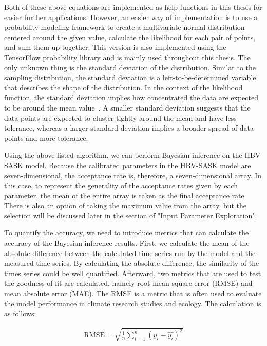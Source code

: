 Both of these above equations are implemented as help functions in this thesis for easier further applications. However, an easier way of implementation is to use a probability modeling framework to create a multivariate normal distribution centered around the given value, calculate the likelihood for each pair of points, and sum them up together. This version is also implemented using the TensorFlow probability library and is mainly used throughout this thesis. The only unknown thing is the standard deviation of the distribution. Similar to the sampling distribution, the standard deviation is a left-to-be-determined variable that describes the shape of the distribution. In the context of the likelihood function, the standard deviation implies how concentrated the data are expected to be around the mean value~\cite{standard_deviation_estimation}. A smaller standard deviation suggests that the data points are expected to cluster tightly around the mean and have less tolerance, whereas a larger standard deviation implies a broader spread of data points and more tolerance. 

Using the above-listed algorithm, we can perform Bayesian inference on the HBV-SASK model. Because the calibrated parameters in the HBV-SASK model are seven-dimensional, the acceptance rate is, therefore, a seven-dimensional array. In this case, to represent the generality of the acceptance rates given by each parameter, the mean of the entire array is taken as the final acceptance rate. There is also an option of taking the maximum value from the array, but the selection will be discussed later in the section of "Input Parameter Exploration".

To quantify the accuracy, we need to introduce metrics that can calculate the accuracy of the Bayesian inference results. First, we calculate the mean of the absolute difference between the calculated time series run by the model and the measured time series. By calculating the absolute difference, the similarity of the times series could be well quantified. Afterward, two metrics that are used to test the goodness of fit are calculated, namely root mean square error (RMSE) and mean absolute error (MAE). The RMSE is a metric that is often used to evaluate the model performance in climate research studies and ecology. The calculation is as follows: 

\begin{align}
\text{RMSE} = \sqrt{\frac 1 n \sum_{i=1}^n (y_i - \hat{y_i})^2}
\end{align}

